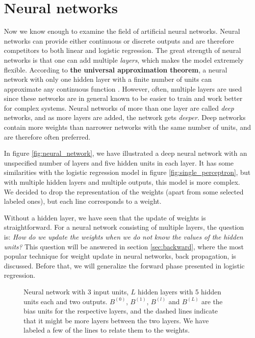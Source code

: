 \section{Neural networks} \label{sec:neural_network}
Now we know enough to examine the field of artificial neural networks. Neural networks can provide either continuous or discrete outputs and are therefore competitors to both linear and logistic regression. The great strength of neural networks is that one can add multiple \textit{layers}, which makes the model extremely flexible. According to \textbf{the universal approximation theorem}, a neural network with only one hidden layer with a finite number of units can approximate any continuous function \supercite{hornik_multilayer_1989}. However, often, multiple layers are used since these networks are in general known to be easier to train and work better for complex systems. Neural networks of more than one layer are called \textit{deep} networks, and as more layers are added, the network gets \textit{deeper}. Deep networks contain more weights than narrower networks with the same number of units, and are therefore often preferred.

In figure \eqref{fig:neural_network}, we have illustrated a deep neural network with an unspecified number of layers and five hidden units in each layer. It has some similarities with the logistic regression model in figure \eqref{fig:single_perceptron}, but with multiple hidden layers and multiple outputs, this model is more complex. We decided to drop the representation of the weights (apart from some selected labeled ones), but each line corresponds to a weight.

Without a hidden layer, we have seen that the update of weights is straightforward. For a neural network consisting of multiple layers, the question is: \textit{How do we update the weights when we do not know the values of the hidden units?} This question will be answered in section \ref{sec:backward}, where the most popular technique for weight update in neural networks, back propagation, is discussed. Before that, we will generalize the forward phase presented in logistic regression.

\begin{figure}
	\centering
	
	\caption{Neural network with 3 input units, $L$ hidden layers with 5 hidden units each and two outputs. $B^{(0)}$, $B^{(1)}$, $B^{(l)}$ and $B^{(L)}$ are the bias units for the respective layers, and the dashed lines indicate that it might be more layers between the two layers. We have labeled a few of the lines to relate them to the weights.}
	\label{fig:neural_network}
\end{figure}

